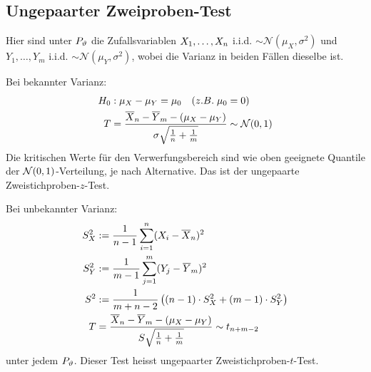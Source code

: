 \subsection{Ungepaarter Zweiproben-Test}
Hier sind unter $P_\vartheta$ die Zufallsvariablen $X_1, \dots, X_n$ i.i.d. $\sim
  \mathcal{N} (\mu_X, \sigma^2)$ und $Y_1, \dots, Y_m$ i.i.d. $\sim \mathcal{N}
  (\mu_Y, \sigma^2)$, wobei die Varianz in beiden Fällen dieselbe ist.
\begin{compactitem}
  \item Bei bekannter Varianz:
        \begin{align*}
          H_0 & : \mu_X - \mu_Y = \mu_0 \quad  (z.B. \; \mu_0 = 0)                                                                                \\
          T   & = \frac{\overline{X}_n - \overline{Y}_m -  (\mu_X - \mu_Y)}{\sigma \sqrt{\frac{1}{n} + \frac{1}{m}}} \sim \mathcal{N} (0, 1)
        \end{align*}
        Die kritischen Werte für den Verwerfungsbereich sind wie oben
        geeignete Quantile der $\mathcal{N} (0, 1)$-Verteilung, je nach
        Alternative. Das ist der ungepaarte Zweistichproben-$z$-Test.

  \item Bei unbekannter Varianz:
        \begin{align*}
          S_X^2 & := \frac{1}{n-1} \sum_{i = 1}^n  (X_i - \overline{X}_n)^2                                                                 \\
          S_Y^2 & := \frac{1}{m-1} \sum_{j = 1}^m  (Y_j - \overline{Y}_m)^2                                                      \\
          S^2   & := \frac{1}{m+n-2} \left(  (n-1) \cdot S_X^2 +  (m-1) \cdot S_Y^2 \right)                                      \\
          T     & = \frac{\overline{X}_n - \overline{Y}_m -  (\mu_X - \mu_Y)}{S \sqrt{\frac{1}{n} + \frac{1}{m}}} \sim t_{n+m-2}
        \end{align*}
        unter jedem $P_\vartheta$. Dieser Test heisst ungepaarter Zweistichproben-$t$-Test.
\end{compactitem}
